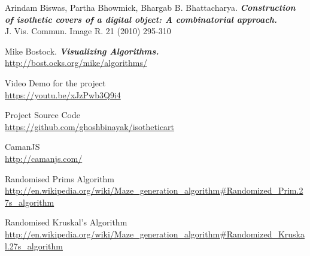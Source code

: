 \documentclass[12pt]{article}
\begin{document}
\begin{thebibliography}{9}
	{
		Arindam Biswas, Partha Bhowmick, Bhargab B. Bhattacharya. 
		{\bf \em Construction of isothetic covers of a digital object: A combinatorial approach.}\\
		 J. Vis. Commun. Image R. 21 (2010) 295-310
	}
	
	{
		Mike Bostock. {\bf \em Visualizing Algorithms.}\\
		\url{http://bost.ocks.org/mike/algorithms/}
	}
	
	{
		Video Demo for the project\\
		\url{https://youtu.be/xJzPwb3Q9i4}
	}
	
	{
		Project Source Code\\
		\url{https://github.com/ghoshbinayak/isotheticart}
	}
	
	{
		CamanJS\\
		\url{http://camanjs.com/}
	}
	
	{
		Randomised Prims Algorithm\\
		\url{http://en.wikipedia.org/wiki/Maze_generation_algorithm#Randomized_Prim.27s_algorithm}
	}
	
	{
		Randomised Kruskal's Algorithm\\
		\url{http://en.wikipedia.org/wiki/Maze_generation_algorithm#Randomized_Kruskal.27s_algorithm}
	}
	
\end{thebibliography}




\newpage
\end{document}
